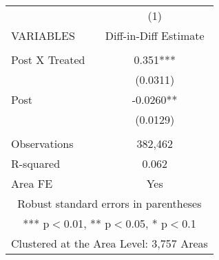 \begin{tabular}{lc} \hline
 & (1) \\
VARIABLES & Diff-in-Diff Estimate \\ \hline
 &  \\
Post X Treated & 0.351*** \\
 & (0.0311) \\
Post & -0.0260** \\
 & (0.0129) \\
 &  \\
Observations & 382,462 \\
R-squared & 0.062 \\
 Area FE & Yes \\ \hline
\multicolumn{2}{c}{ Robust standard errors in parentheses} \\
\multicolumn{2}{c}{ *** p$<$0.01, ** p$<$0.05, * p$<$0.1} \\
\multicolumn{2}{c}{ Clustered at the Area Level: 3,757 Areas} \\
\end{tabular}
